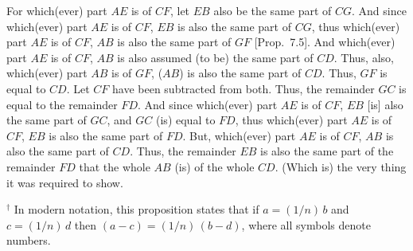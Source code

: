 \begin{Parallel}{}{}
{For which(ever) part $AE$ is of $CF$, let $EB$ also be the same part of $CG$.
And since which(ever) part $AE$ is of $CF$, $EB$ is also the same part
of $CG$, thus which(ever) part $AE$ is of $CF$, $AB$ is also the same part of
$GF$ [Prop.~7.5]. And which(ever) part $AE$ is of $CF$, $AB$ is also assumed (to be)
the same part of $CD$. Thus, also, which(ever) part $AB$ is of $GF$, ($AB$) is also
the same part of $CD$. Thus, $GF$ is equal to $CD$. Let $CF$ have been subtracted from
both. Thus, the remainder $GC$ is equal to the remainder $FD$. And since
which(ever) part $AE$ is of $CF$, $EB$ [is] also the same part of $GC$, and $GC$ (is)
equal to $FD$, thus which(ever) part $AE$ is of $CF$, $EB$ is also the same part of
$FD$.
 But, 
which(ever) part $AE$ is of $CF$, $AB$ is also the same part of $CD$. Thus, the
remainder $EB$ is also the same part of the remainder $FD$ that
the whole $AB$ (is) of the whole $CD$. (Which is) the very thing it
was required to show.}
\end{Parallel}
{\footnotesize \noindent$^\dag$ In modern notation, this
proposition states that if $a=(1/n)\,b$ and $c=(1/n)\,d$ then $(a-c)=
(1/n)\,(b-d)$, where all symbols denote numbers.}

